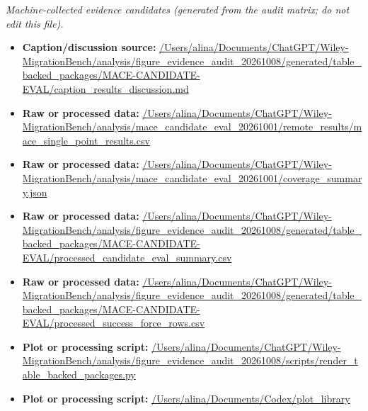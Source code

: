 \emph{Machine-collected evidence candidates (generated from the audit matrix; do not edit this file).}
\begin{itemize}[leftmargin=1.4em,noitemsep]
\item \textbf{Caption/discussion source:} \url{/Users/alina/Documents/ChatGPT/Wiley-MigrationBench/analysis/figure_evidence_audit_20261008/generated/table_backed_packages/MACE-CANDIDATE-EVAL/caption_results_discussion.md}
\item \textbf{Raw or processed data:} \url{/Users/alina/Documents/ChatGPT/Wiley-MigrationBench/analysis/mace_candidate_eval_20261001/remote_results/mace_single_point_results.csv}
\item \textbf{Raw or processed data:} \url{/Users/alina/Documents/ChatGPT/Wiley-MigrationBench/analysis/mace_candidate_eval_20261001/coverage_summary.json}
\item \textbf{Raw or processed data:} \url{/Users/alina/Documents/ChatGPT/Wiley-MigrationBench/analysis/figure_evidence_audit_20261008/generated/table_backed_packages/MACE-CANDIDATE-EVAL/processed_candidate_eval_summary.csv}
\item \textbf{Raw or processed data:} \url{/Users/alina/Documents/ChatGPT/Wiley-MigrationBench/analysis/figure_evidence_audit_20261008/generated/table_backed_packages/MACE-CANDIDATE-EVAL/processed_success_force_rows.csv}
\item \textbf{Plot or processing script:} \url{/Users/alina/Documents/ChatGPT/Wiley-MigrationBench/analysis/figure_evidence_audit_20261008/scripts/render_table_backed_packages.py}
\item \textbf{Plot or processing script:} \url{/Users/alina/Documents/Codex/plot_library}
\end{itemize}
